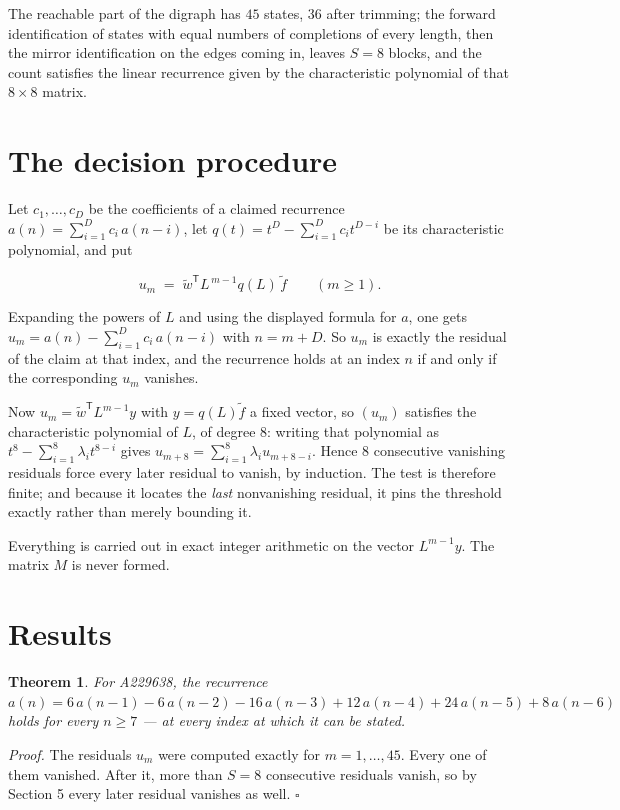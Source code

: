 \documentclass[11pt]{article}
\newtheorem{theorem}{Theorem}
\theoremstyle{definition}
\begin{document}
The reachable part of the digraph has $45$ states, $36$ after trimming; the forward identification of states with equal numbers of completions of every length, then the mirror identification on the edges coming in, leaves $S = 8$ blocks, and the count satisfies the linear recurrence given by the characteristic polynomial of that $8\times8$ matrix.

\section{The decision procedure}

Let $c_1,\dots,c_D$ be the coefficients of a claimed recurrence $a(n) = \sum_{i=1}^{D} c_i\,a(n-i)$, let $q(t) = t^{D} - \sum_{i=1}^{D} c_i t^{D-i}$ be its characteristic polynomial, and put

\[u_m \;=\; \tilde w^{\mathsf T} L^{\,m-1} q(L)\,\tilde f \qquad (m \ge 1).\]

Expanding the powers of $L$ and using the displayed formula for $a$, one gets $u_m = a(n) - \sum_{i=1}^{D} c_i\,a(n-i)$ with $n = m + D$. So $u_m$ is exactly the residual of the claim at that index, and the recurrence holds at an index $n$ if and only if the corresponding $u_m$ vanishes.

Now $u_m = \tilde w^{\mathsf T} L^{m-1} y$ with $y = q(L)\tilde f$ a fixed vector, so $(u_m)$ satisfies the characteristic polynomial of $L$, of degree $8$: writing that polynomial as $t^{8} - \sum_{i=1}^{8} \lambda_i t^{8-i}$ gives $u_{m+8} = \sum_{i=1}^{8} \lambda_i u_{m+8-i}$. Hence $8$ consecutive vanishing residuals force every later residual to vanish, by induction. The test is therefore finite; and because it locates the {\itshape last} nonvanishing residual, it pins the threshold exactly rather than merely bounding it.

Everything is carried out in exact integer arithmetic on the vector $L^{m-1}y$. The matrix $M$ is never formed.

\section{Results}

\begin{theorem} For A229638, the recurrence $a(n) = 6\,a(n-1) - 6\,a(n-2) - 16\,a(n-3) + 12\,a(n-4) + 24\,a(n-5) + 8\,a(n-6)$ holds for every $n \ge 7$ --- at every index at which it can be stated.\end{theorem}

{\itshape Proof.} The residuals $u_m$ were computed exactly for $m = 1,\dots,45$. Every one of them vanished. After it, more than $S = 8$ consecutive residuals vanish, so by Section 5 every later residual vanishes as well. $\square$
\end{document}
